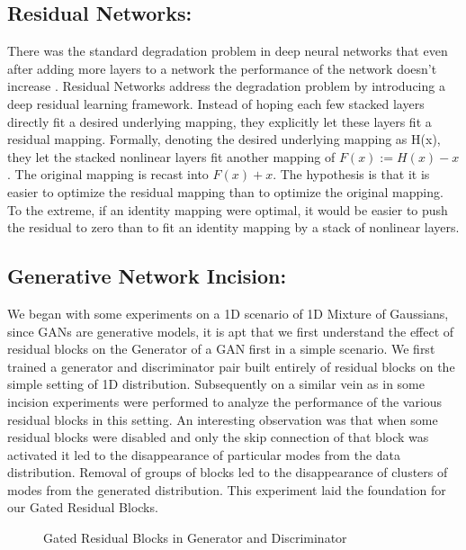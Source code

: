 \subsection*{Residual Networks:}
There was the standard degradation problem in deep neural networks that even after adding more layers to a network the performance of the network doesn't increase . Residual Networks\cite{he2016deep} address the degradation problem by introducing a deep residual learning framework. Instead of hoping each few stacked layers directly fit a desired underlying mapping, they explicitly let these layers fit a residual mapping. Formally, denoting the desired underlying mapping as H(x), they let the stacked nonlinear layers fit another mapping of $F(x):=H(x)-x$. The original mapping is recast into $F(x)+x$. The hypothesis is that it is easier to optimize the residual mapping than to optimize the original mapping. To the extreme, if an identity mapping were optimal, it would be easier to push the residual to zero than to fit an identity mapping by a stack of nonlinear layers.



\subsection*{Generative Network Incision:}
We began with some experiments on a 1D scenario of 1D Mixture of Gaussians, since GANs are generative models, it is apt that we first understand the effect of residual blocks on the Generator of a GAN first in a simple scenario. We first trained a generator and discriminator pair built entirely of residual blocks on the simple setting of 1D distribution. Subsequently on a similar vein as in \cite{veit2016residual} some incision experiments were performed to analyze the performance of the various residual blocks in this setting. An interesting observation was that when some residual blocks were disabled and only the skip connection of that block was activated it led to the disappearance of particular modes from the data distribution. Removal of groups of blocks led to the disappearance of clusters of modes from the generated distribution. This experiment laid the foundation for our Gated Residual Blocks.

\begin{figure*}%
    \centering
    \caption{Gated Residual Blocks in Generator and Discriminator}
    \label{fig:model}
    \vspace{-3mm}
\end{figure*}

